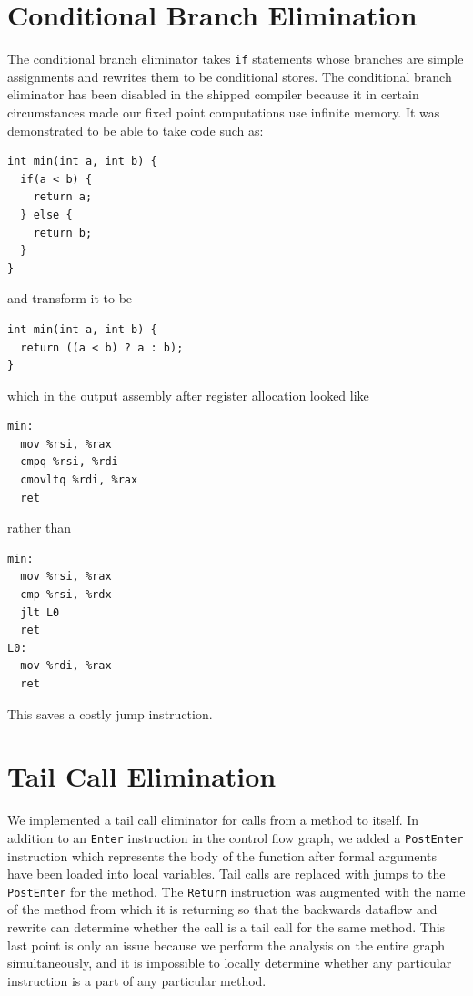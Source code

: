 \documentclass[11pt]{article}
\begin{document}

\section {Conditional Branch Elimination} 

The conditional branch eliminator takes \texttt{if} statements whose
branches are simple assignments and rewrites them to be conditional
stores.  The conditional branch eliminator has been disabled in the
shipped compiler because it in certain circumstances made our fixed
point computations use infinite memory.  It was demonstrated to be
able to take code such as:
\begin{verbatim}
int min(int a, int b) {
  if(a < b) {
    return a;
  } else {
    return b;
  }
}
\end{verbatim}
and transform it to be
\begin{verbatim}
int min(int a, int b) {
  return ((a < b) ? a : b);
}
\end{verbatim}
which in the output assembly after register allocation looked like
\begin{verbatim}
min:
  mov %rsi, %rax
  cmpq %rsi, %rdi
  cmovltq %rdi, %rax
  ret
\end{verbatim}
rather than
\begin{verbatim}
min:
  mov %rsi, %rax
  cmp %rsi, %rdx
  jlt L0
  ret
L0:
  mov %rdi, %rax
  ret
\end{verbatim}

This saves a costly jump instruction.

\section{Tail Call Elimination}

We implemented a tail call eliminator for calls from a method to
itself.  In addition to an \texttt{Enter} instruction in the control
flow graph, we added a \texttt{PostEnter} instruction which represents
the body of the function after formal arguments have been loaded into
local variables.  Tail calls are replaced with jumps to the
\texttt{PostEnter} for the method.  The \texttt{Return} instruction
was augmented with the name of the method from which it is returning
so that the backwards dataflow and rewrite can determine whether the
call is a tail call for the same method.  This last point is only an
issue because we perform the analysis on the entire graph
simultaneously, and it is impossible to locally determine whether any
particular instruction is a part of any particular method.
\end{document}
